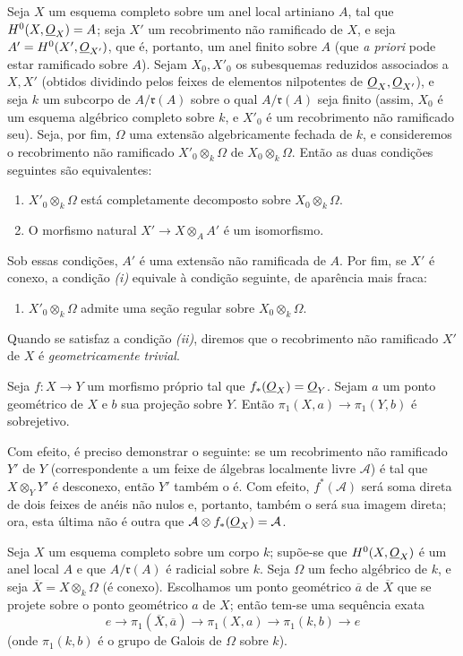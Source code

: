  Seja $X$ um esquema completo sobre um anel local artiniano
$A$, tal que $H^0(X,\underline{O}_X)=A$; seja $X'$ um recobrimento não ramificado de $X$,
e seja $A'=H^0(X',\underline{O}_{X'})$, que é, portanto, um anel finito sobre $A$
(que \textit{a priori} pode estar ramificado sobre $A$). Sejam $X_0,X'_0$ os
subesquemas reduzidos associados a $X,X'$ (obtidos dividindo pelos feixes de
elementos nilpotentes de $\underline{O}_X,\underline{O}_{X'}$), e seja $k$ um subcorpo de
$A/\mathfrak r(A)$ sobre o qual $A/\mathfrak r(A)$ seja finito (assim, $X_0$ é
um esquema algébrico completo sobre $k$, e $X'_0$ é um recobrimento não
ramificado seu). Seja, por fim, $\Omega$ uma extensão algebricamente
fechada de $k$, e consideremos o recobrimento não ramificado
$X'_0\otimes_k\Omega$ de $X_0\otimes_k\Omega$. Então as duas condições
seguintes são equivalentes:
\begin{enumerate}
  \item[\textit{i.}] $X'_0\otimes_k\Omega$ está completamente decomposto
    sobre $X_0\otimes_k\Omega$.
  \item[\textit{ii.}] O morfismo natural
    $X'\longrightarrow X\otimes_A A'$ é um isomorfismo.
\end{enumerate}
Sob essas condições, $A'$ é uma extensão não ramificada de $A$. Por fim,
se $X'$ é conexo, a condição \textit{(i)} equivale à condição seguinte,
de aparência mais fraca:
\begin{enumerate}
  \item[\textit{i bis.}] $X'_0\otimes_k\Omega$ admite uma seção regular
    sobre $X_0\otimes_k\Omega$.
\end{enumerate}
Quando se satisfaz a condição \textit{(ii)}, diremos que o recobrimento não
ramificado $X'$ de $X$ é \emph{geometricamente trivial}.

 Seja $f:X\longrightarrow Y$ um morfismo próprio tal que
$f_*(\underline{O}_X)=\underline{O}_Y$. Sejam $a$ um ponto geométrico de $X$ e $b$ sua projeção
sobre $Y$. Então $\pi_1(X,a)\longrightarrow\pi_1(Y,b)$ é sobrejetivo.

Com efeito, é preciso demonstrar o seguinte: se um recobrimento não ramificado
$Y'$ de $Y$ (correspondente a um feixe de álgebras localmente livre
$\mathcal A$) é tal que $X\otimes_Y Y'$ é desconexo, então $Y'$ também o
é. Com efeito, $f^*(\mathcal A)$ será soma direta de dois feixes de anéis não
nulos e, portanto, também o será sua imagem direta; ora, esta última
não é outra que $\mathcal A\otimes f_*(\underline{O}_X)=\mathcal A$.

 Seja $X$ um esquema completo sobre um corpo $k$; supõe-se que
$H^0(X,\underline{O}_X)$ é um anel local $A$ e que $A/\mathfrak r(A)$ é radicial
sobre $k$. Seja $\Omega$ um fecho algébrico de $k$, e seja
$\overline X=X\otimes_k\Omega$ (é conexo). Escolhamos um ponto geométrico
$\overline a$ de $\overline X$ que se projete sobre o ponto geométrico $a$ de
$X$; então tem-se uma sequência exata
\[
  e\longrightarrow\pi_1(\overline X,\overline a)
  \longrightarrow\pi_1(X,a)
  \longrightarrow\pi_1(k,b)\longrightarrow e
\]
(onde $\pi_1(k,b)$ é o grupo de Galois de $\Omega$ sobre $k$).

